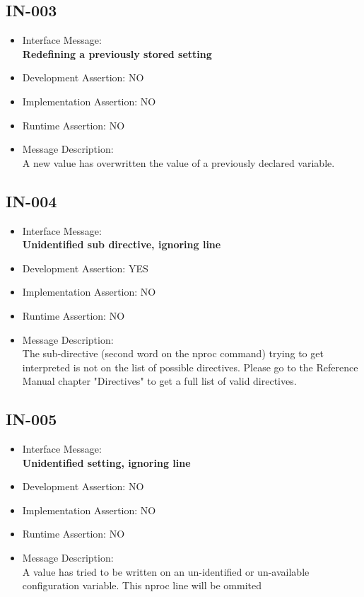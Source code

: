\subsection{IN-003}
\begin{itemize}
  \item Interface Message:\\[1em]\textbf{Redefining a previously stored setting}
  \item Development Assertion: NO
  \item Implementation Assertion: NO
  \item Runtime Assertion: NO
  \item Message Description:\\[1em]A new value has overwritten the value of a previously declared variable.
\end{itemize}

\subsection{IN-004}
\begin{itemize}
  \item Interface Message:\\[1em]\textbf{Unidentified sub directive, ignoring line}
  \item Development Assertion: YES
  \item Implementation Assertion: NO
  \item Runtime Assertion: NO
  \item Message Description:\\[1em]The sub-directive (second word on the nproc command)  trying to get interpreted is not on the list of possible directives. Please go to the Reference Manual chapter "Directives" to get a full list of valid directives.
\end{itemize}

\subsection{IN-005}
\begin{itemize}
  \item Interface Message:\\[1em]\textbf{Unidentified setting, ignoring line}
  \item Development Assertion: NO
  \item Implementation Assertion: NO
  \item Runtime Assertion: NO
  \item Message Description:\\[1em]A value has tried to be written on an un-identified or un-available configuration variable. This nproc line will be ommited
\end{itemize}

